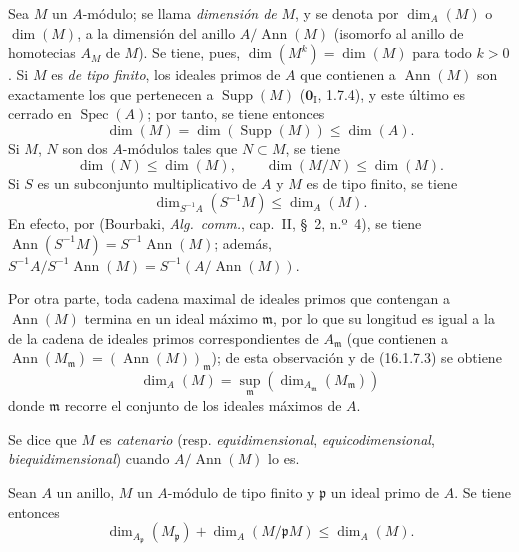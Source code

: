 \begin{env}[16.1.7]
\label{0.16.1.7-fr}
Sea $M$ un $A$-módulo; se llama \emph{dimensión de} $M$, y se denota por
$\dim_A(M)$ o $\dim(M)$, a la dimensión del anillo $A/\operatorname{Ann}(M)$
(isomorfo al anillo de homotecias $A_M$ de $M$). Se tiene, pues,
$\dim(M^k)=\dim(M)$ para todo $k>0$. Si $M$ es \emph{de tipo finito}, los ideales
primos de $A$ que contienen a $\operatorname{Ann}(M)$ son exactamente los que
pertenecen a $\operatorname{Supp}(M)$ ($\mathbf{0}_{\mathrm I}$, 1.7.4), y este último
es cerrado en $\operatorname{Spec}(A)$; por tanto, se tiene entonces
\[
\label{0.16.1.7.1-fr}
  \dim(M)=\dim(\operatorname{Supp}(M))\leq\dim(A).
\tag{16.1.7.1}
\]
Si $M$, $N$ son dos $A$-módulos tales que $N\subset M$, se tiene
\[
\label{0.16.1.7.2-fr}
  \dim(N)\leq\dim(M),\qquad \dim(M/N)\leq\dim(M).
\tag{16.1.7.2}
\]
Si $S$ es un subconjunto multiplicativo de $A$ y $M$ es de tipo finito, se
tiene
\[
\label{0.16.1.7.3-fr}
  \dim_{S^{-1}A}(S^{-1}M)\leq\dim_A(M).
\tag{16.1.7.3}
\]
En efecto, por (Bourbaki, \emph{Alg.~comm.}, cap.~II, \S~2, n.º~4), se tiene
$\operatorname{Ann}(S^{-1}M)=S^{-1}\operatorname{Ann}(M)$; además,
$S^{-1}A/S^{-1}\operatorname{Ann}(M)=S^{-1}(A/\operatorname{Ann}(M))$.

Por otra parte, toda cadena maximal de ideales primos que contengan a
$\operatorname{Ann}(M)$ termina en un ideal máximo $\mathfrak{m}$, por lo que
su longitud es igual a la de la cadena de ideales primos correspondientes de
$A_{\mathfrak{m}}$ (que contienen a
$\operatorname{Ann}(M_{\mathfrak{m}})=(\operatorname{Ann}(M))_{\mathfrak{m}}$);
de esta observación y de (16.1.7.3) se obtiene
\[
\label{0.16.1.7.4-fr}
  \dim_A(M)=\sup_{\mathfrak{m}}
  (\dim_{A_{\mathfrak{m}}}(M_{\mathfrak{m}}))
\tag{16.1.7.4}
\]
donde $\mathfrak{m}$ recorre el conjunto de los ideales máximos de $A$.

Se dice que $M$ es \emph{catenario} (resp. \emph{equidimensional}, \emph{equicodimensional},
\emph{biequidimensional}) cuando $A/\operatorname{Ann}(M)$ lo es.
\end{env}


\begin{proposition}[16.1.8]
\label{0.16.1.8-fr}

Sean $A$ un anillo, $M$ un $A$-módulo de tipo finito y $\mathfrak{p}$ un ideal
primo de $A$. Se tiene entonces
\[
\label{0.16.1.8.1-fr}
  \dim_{A_{\mathfrak{p}}}(M_{\mathfrak{p}})
  +\dim_A(M/\mathfrak{p}M)\leq\dim_A(M).
\tag{16.1.8.1}
\]
\end{proposition}

